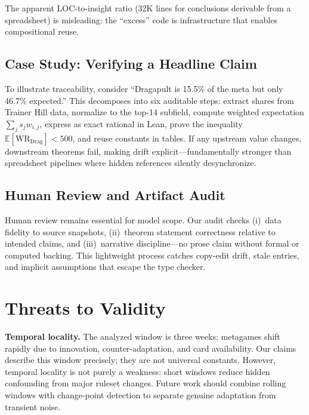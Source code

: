 \documentclass[journal]{IEEEtran}
\let\origsection\section
\renewcommand{\section}{\needspace{4\baselineskip}\origsection}
\let\origsubsection\subsection
\renewcommand{\subsection}{\needspace{3\baselineskip}\origsubsection}
\begin{document}
The apparent LOC-to-insight ratio (32K lines for conclusions derivable from a spreadsheet) is misleading: the ``excess'' code is infrastructure that enables compositional reuse.

\subsection{Case Study: Verifying a Headline Claim}

To illustrate traceability, consider ``Dragapult is 15.5\% of the meta but only 46.7\% expected.'' This decomposes into six auditable steps: extract shares from Trainer Hill data, normalize to the top-14 subfield, compute weighted expectation $\sum_j s_j w_{i,j}$, express as exact rational in Lean, prove the inequality $\mathbb{E}[\mathrm{WR}_{\mathrm{Drag}}] < 500$, and reuse constants in tables.
If any upstream value changes, downstream theorems fail, making drift explicit---fundamentally stronger than spreadsheet pipelines where hidden references silently desynchronize.

\subsection{Human Review and Artifact Audit}

Human review remains essential for model scope.
Our audit checks (i)~data fidelity to source snapshots, (ii)~theorem statement correctness relative to intended claims, and (iii)~narrative discipline---no prose claim without formal or computed backing.
This lightweight process catches copy-edit drift, stale entries, and implicit assumptions that escape the type checker.

\section{Threats to Validity}\label{sec:threats}

\textbf{Temporal locality.}
The analyzed window is three weeks; metagames shift rapidly due to innovation, counter-adaptation, and card availability.
Our claims describe this window precisely; they are not universal constants.
However, temporal locality is not purely a weakness: short windows reduce hidden confounding from major ruleset changes.
Future work should combine rolling windows with change-point detection to separate genuine adaptation from transient noise.
\end{document}
